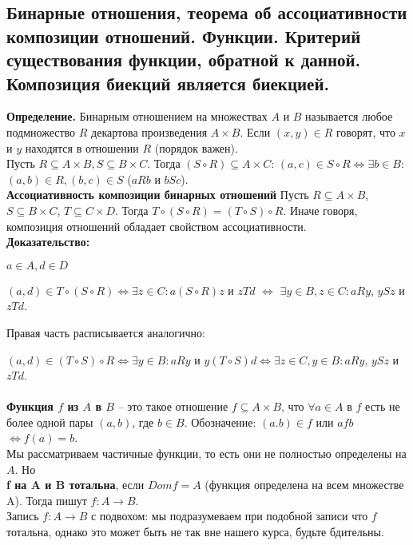 \subsection{Бинарные отношения, теорема об ассоциативности композиции отношений. Функции. Критерий существования функции, обратной к данной. Композиция биекций является биекцией.}

\textbf{Определение.} Бинарным отношением на множествах $A$ и $B$ называется любое подмножество $R$ декартова произведения $A \times B$. Если $(x, y) \in R$ говорят, что $x$ и $y$ находятся в отношении $R$ (порядок важен). \\

Пусть $R \subseteq A \times B, S \subseteq B \times C$. Тогда $(S \circ R) \subseteq A \times C$: $(a, c) \in S \circ R \Leftrightarrow \exists b \in B:$ $(a, b) \in R, (b, c) \in S$ ($aRb$ и $bSc$). \\


\textbf{Ассоциативность композиции бинарных отношений} Пусть $R \subseteq A \times B$, $S \subseteq B \times C$, $T \subseteq C \times D$. Тогда $T \circ (S \circ R) = (T \circ S) \circ R$. Иначе говоря, композиция отношений обладает свойством ассоциативности. \\

\textbf{Доказательство:}

$a \in A, d \in D$

$(a, d) \in T \circ (S \circ R) \Leftrightarrow \exists z \in C: a(S \circ R)z$ и $zTd$ $\Leftrightarrow$ $\exists y \in B, z \in C: aRy$, $ySz$ и $zTd$.

Правая часть расписывается аналогично:

$(a, d) \in (T \circ S) \circ R \Leftrightarrow \exists y \in B: aRy$ и $y(T \circ S)d \Leftrightarrow \exists z \in C, y \in B: aRy$, $ySz$ и $zTd$. \\  \\

\textbf{Функция $f$ из $A$ в $B$} -- это такое отношение $f \subseteq A \times B$, что $\forall a \in A$ в $f$ есть не более одной пары $(a, b)$, где $b \in B$.
Обозначение: $(a. b) \in f$ или $afb$ $\Leftrightarrow f(a) = b$. \\
Мы рассматриваем частичные функции, то есть они не полностью определены на $A$. Но \\
\textbf{f на A и B тотальна}, если $Dom f = A$ (функция определена на всем множестве A). Тогда пишут $f: A \rightarrow B$. \\
Запись $f: A \rightarrow B$ с подвохом: мы подразумеваем при подобной записи что $f$ тотальна, однако это может быть не так вне нашего курса, будьте бдительны. \\ \\

